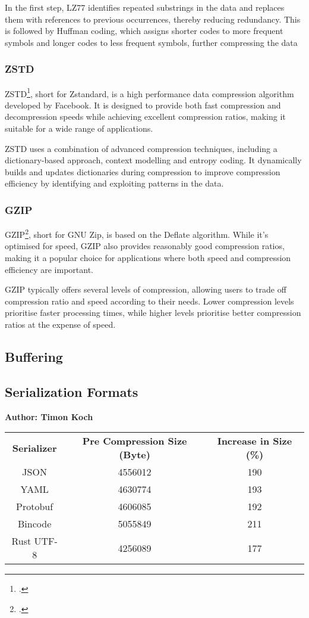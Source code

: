 In the first step, LZ77 identifies repeated substrings in the data and replaces them with references to previous occurrences, thereby reducing redundancy. This is followed by Huffman coding, which assigns shorter codes to more frequent symbols and longer codes to less frequent symbols, further compressing the data

\subsubsection{ZSTD}
ZSTD\footcite{zstd}, short for Zstandard, is a high performance data compression algorithm developed by Facebook. It is designed to provide both fast compression and decompression speeds while achieving excellent compression ratios, making it suitable for a wide range of applications.

ZSTD uses a combination of advanced compression techniques, including a dictionary-based approach, context modelling and entropy coding. It dynamically builds and updates dictionaries during compression to improve compression efficiency by identifying and exploiting patterns in the data.

\subsubsection{GZIP}
GZIP\footcite{gzip}, short for GNU Zip, is based on the Deflate algorithm. While it's optimised for speed, GZIP also provides reasonably good compression ratios, making it a popular choice for applications where both speed and compression efficiency are important.

GZIP typically offers several levels of compression, allowing users to trade off compression ratio and speed according to their needs. Lower compression levels prioritise faster processing times, while higher levels prioritise better compression ratios at the expense of speed.

\subsection{Buffering}

\subsection{Serialization Formats}
\textbf{Author: Timon Koch}



\begin{table}[]
\begin{tabular}{ccc}
\textbf{Serializer} & \textbf{Pre Compression Size (Byte)} & \textbf{Increase in Size (\%)} \\
JSON       & 4556012 & 190 \\
YAML       & 4630774 & 193 \\
Protobuf   & 4606085 & 192 \\
Bincode    & 5055849 & 211 \\
Rust UTF-8 & 4256089 & 177
\end{tabular}
\end{table}



